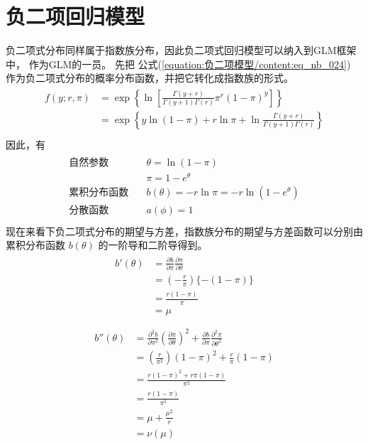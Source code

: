\documentclass[letterpaper,10pt,english]{sphinxmanual}
\begin{document}
\section{负二项回归模型}
\label{\detokenize{_u8d1f_u4e8c_u9879_u6a21_u578b/content:id5}}
负二项式分布同样属于指数族分布，因此负二项式回归模型可以纳入到GLM框架中，
作为GLM的一员。
先把 公式(\ref{equation:负二项模型/content:eq_nb_024}) 作为负二项式分布的概率分布函数，并把它转化成指数族的形式。
\begin{align}\label{equation:负二项模型/content:eq_nb_031}\!\begin{aligned}
f(y;r,\pi) &= \exp \left \{ \ln \left [ \frac{\Gamma(y+r)  }{\Gamma(y+1) \Gamma(r) }
\pi^r (1-\pi)^y \right ] \right \}\\
&= \exp \left \{
y \ln (1-\pi) + r\ln \pi + \ln \frac{\Gamma(y+r)  }{\Gamma(y+1) \Gamma(r) }
\right \}\\
\end{aligned}\end{align}
因此，有
\begin{align}\label{equation:负二项模型/content:负二项模型/content:0}\!\begin{aligned}
\text{自然参数} & \quad \theta = \ln (1-\pi)\\
& \quad \pi = 1- e^\theta\\
\text{累积分布函数} & \quad b(\theta) = - r\ln \pi = -r \ln (1-e^\theta)\\
\text{分散函数} & \quad a(\phi) = 1\\
\end{aligned}\end{align}
现在来看下负二项式分布的期望与方差，指数族分布的期望与方差函数可以分别由
累积分布函数 \(b(\theta)\) 的一阶导和二阶导得到。
\begin{align}\label{equation:负二项模型/content:负二项模型/content:1}\!\begin{aligned}
b'(\theta) &= \frac{\partial b}{ \partial \pi} \frac{\partial \pi}{ \partial \theta}\\
&= \left (- \frac{r}{\pi} \right ) \{  -(1-\pi) \}\\
&= \frac{r(1-\pi)}{\pi}\\
&= \mu\\
\end{aligned}\end{align}\begin{align}\label{equation:负二项模型/content:负二项模型/content:2}\!\begin{aligned}
b''(\theta) &= \frac{\partial^2 b}{ \partial \pi^2} \left (\frac{\partial \pi}{ \partial \theta} \right )^2
+  \frac{\partial b}{ \partial \pi} \frac{\partial^2 \pi}{ \partial \theta^2}\\
&= \left ( \frac{r}{\pi^2}  \right )(1-\pi)^2 + \frac{r}{\pi}(1-\pi)\\
&=\frac{r(1-\pi)^2  +r\pi(1-\pi)  }{\pi^2}\\
&= \frac{r(1-\pi)}{\pi^2}\\
&= \mu + \frac{\mu^2}{r}\\
&= \nu(\mu)\\
\end{aligned}\end{align}
\end{document}
